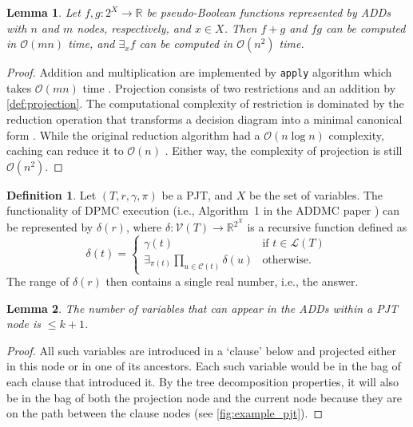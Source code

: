 \documentclass{article}
\newtheorem{lemma}{Lemma}
\theoremstyle{definition}
\newtheorem{definition}{Definition}
\theoremstyle{remark}
\begin{document}
\begin{lemma}
  Let $f,g\colon 2^X \to \mathbb{R}$ be pseudo-Boolean functions represented by
  ADDs with $n$ and $m$ nodes, respectively, and $x \in X$. Then $f+g$ and $fg$
  can be computed in $\mathcal{O}(mn)$ time, and $\exists_xf$ can be computed in
  $\mathcal{O}(n^2)$ time.
\end{lemma}
\begin{proof}
  Addition and multiplication are implemented by \texttt{apply} algorithm which
  takes $\mathcal{O}(mn)$ time \cite{DBLP:journals/tc/Bryant86}. Projection
  consists of two restrictions and an addition by \cref{def:projection}. The
  computational complexity of restriction is dominated by the reduction
  operation that transforms a decision diagram into a minimal canonical form
  \cite{DBLP:journals/tc/Bryant86}. While the original reduction algorithm had a
  $\mathcal{O}(n \log n)$ complexity, caching can reduce it to $\mathcal{O}(n)$
  \cite{somenzi1998cudd}. Either way, the complexity of projection is still
  $\mathcal{O}(n^2)$.
\end{proof}

\begin{definition}
  Let $(T, r, \gamma, \pi)$ be a PJT, and $X$ be the set of variables. The
  functionality of DPMC execution (i.e., Algorithm~1 in the ADDMC paper
  \cite{DBLP:conf/aaai/DudekPV20}) can be represented by $\delta(r)$, where
  $\delta\colon \mathcal{V}(T) \to \mathbb{R}^{2^X}$ is a recursive function
  defined as
  \[
    \delta(t) =
    \begin{cases}
      \gamma(t) & \text{if } t \in \mathcal{L}(T) \\
      \exists_{\pi(t)} \prod_{u \in \mathcal{C}(t)} \delta(u) & \text{otherwise.}
    \end{cases}
  \]
  The range of $\delta(r)$ then contains a single real number, i.e., the answer.
\end{definition}

\begin{lemma}
  The number of variables that can appear in the ADDs within a PJT node is $\le
  k+1$.
\end{lemma}
\begin{proof}
  All such variables are introduced in a `clause' below and projected either in
  this node or in one of its ancestors. Each such variable would be in the bag
  of each clause that introduced it. By the tree decomposition properties, it
  will also be in the bag of both the projection node and the current node
  because they are on the path between the clause nodes (see
  \cref{fig:example_pjt}).
\end{proof}
\end{document}
